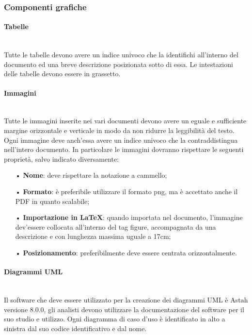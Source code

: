 \subsubsection{Componenti grafiche}

\paragraph{Tabelle}\mbox{}\\
Tutte le tabelle devono avere un indice univoco che la identifichi all’interno del documento ed una breve descrizione posizionata sotto di essa. Le intestazioni delle tabelle devono essere in grassetto.

\paragraph{Immagini}\mbox{}\\
Tutte le immagini inserite nei vari documenti devono avere un eguale e sufficiente margine orizzontale e verticale in modo da non ridurre la leggibilità del testo. Ogni immagine deve anch'essa avere un indice univoco che la contraddistingua nell'intero documento.
In particolare le immagini dovranno rispettare le seguenti proprietà, salvo indicato diversamente:
\begin{itemize}
\item[•] \textbf{Nome}: deve rispettare la {notazione a cammello};
\item[•] \textbf{Formato}: è preferibile utilizzare il formato png, ma è accettato anche il PDF in quanto scalabile;
\item[•] \textbf{Importazione in \LaTeX}: quando importata nel documento, l'immagine dev'essere collocata all'interno del tag figure, accompagnata da una descrizione e con lunghezza massima uguale a 17cm;
\item[•] \textbf{Posizionamento}: preferibilmente deve essere centrata orizzontalmente.
\end{itemize}

\paragraph{Diagrammi UML}\mbox{}\\
Il software che deve essere utilizzato per la creazione dei diagrammi UML è Astah versione 8.0.0, gli analisti devono utilizzare la documentazione del software per il suo studio e utilizzo.
Ogni diagramma di caso d’uso è identificato in alto a sinistra dal suo codice identificativo e dal nome.

